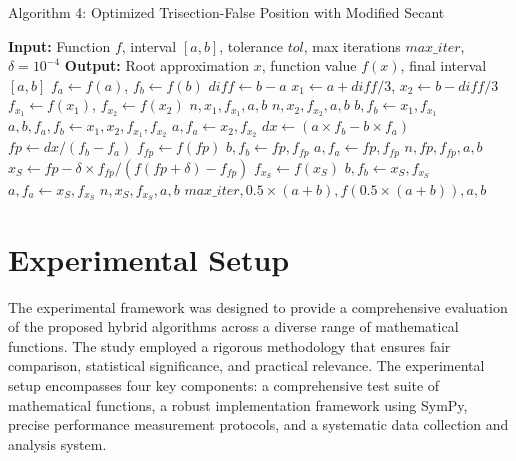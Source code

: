 \documentclass[amsmath, amssymb, aps]{revtex4-2}
\begin{document}
\begin{algorithm}[H]
\caption{Algorithm 4: Optimized Trisection-False Position with Modified Secant}
\begin{algorithmic}[1]
\State \textbf{Input:} Function $f$, interval $[a, b]$, tolerance $tol$, max iterations $max\_iter$, $\delta = 10^{-4}$
\State \textbf{Output:} Root approximation $x$, function value $f(x)$, final interval $[a, b]$
\State $f_a \gets f(a)$, $f_b \gets f(b)$
    \State $diff \gets b - a$
    \State $x_1 \gets a + diff/3$, $x_2 \gets b - diff/3$
    \State $f_{x_1} \gets f(x_1)$, $f_{x_2} \gets f(x_2)$
        \State \Return $n, x_1, f_{x_1}, a, b$
    \EndIf
        \State \Return $n, x_2, f_{x_2}, a, b$
    \EndIf
        \State $b, f_b \gets x_1, f_{x_1}$
        \State $a, b, f_a, f_b \gets x_1, x_2, f_{x_1}, f_{x_2}$
    \Else
        \State $a, f_a \gets x_2, f_{x_2}$
    \EndIf
    \State $dx \gets (a \times f_b - b \times f_a)$
    \State $fp \gets dx / (f_b - f_a)$
    \State $f_{fp} \gets f(fp)$
        \State $b, f_b \gets fp, f_{fp}$
    \Else
        \State $a, f_a \gets fp, f_{fp}$
    \EndIf
        \State \Return $n, fp, f_{fp}, a, b$
    \EndIf
    \State $x_S \gets fp - \delta \times f_{fp} / (f(fp + \delta) - f_{fp})$
        \State $f_{x_S} \gets f(x_S)$
                \State $b, f_b \gets x_S, f_{x_S}$
            \Else
                \State $a, f_a \gets x_S, f_{x_S}$
            \EndIf
                \State \Return $n, x_S, f_{x_S}, a, b$
            \EndIf
        \EndIf
    \EndIf
\EndFor
\State \Return $max\_iter, 0.5 \times (a + b), f(0.5 \times (a + b)), a, b$
\end{algorithmic}
\end{algorithm}

\setlength{\parskip}{1.5ex plus 0.5ex minus 0.2ex}

\section{Experimental Setup}\label{sec:experimental}

The experimental framework was designed to provide a comprehensive evaluation of the proposed hybrid algorithms across a diverse range of mathematical functions. The study employed a rigorous methodology that ensures fair comparison, statistical significance, and practical relevance. The experimental setup encompasses four key components: a comprehensive test suite of mathematical functions, a robust implementation framework using SymPy, precise performance measurement protocols, and a systematic data collection and analysis system.
\end{document}
